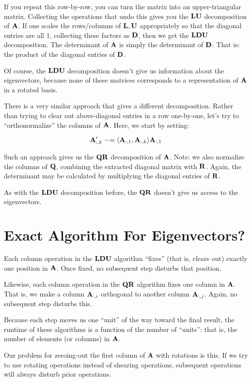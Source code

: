 \documentclass[11pt, oneside]{amsart}
\begin{document}
If you repeat this row-by-row, you can turn the matrix into an
upper-triangular matrix. Collecting the operations that undo this gives
you the $\mathbf{L}\mathbf{U}$ decomposition of $\mathbf{A}$. If one scales the
rows/columns of $\mathbf{L}, \mathbf{U}$ appropriately so that the diagonal
entries are all $1$, collecting these factors as $\mathbf{D}$, then we get
the $\mathbf{L}\mathbf{D}\mathbf{U}$ decomposition. The determinant of $\mathbf{A}$ is simply the
determinant of $\mathbf{D}$. That is: the product of the diagonal entries of
$\mathbf{D}$.

Of course, the $\mathbf{L}\mathbf{D}\mathbf{U}$ decomposition doesn't give us information about
the eigenvectors, because none of these matrices corresponds to a
representation of $\mathbf{A}$ in a rotated basis.

There is a very similar approach that gives a different decomposition.
Rather than trying to clear out above-diagonal entries in a row
one-by-one, let's try to ``orthonormalize'' the columns of $\mathbf{A}$. Here,
we start by setting:

\[
  \mathbf{A}'_{:, k} \mathrel{-}= \langle \mathbf{A}_{:, 1}, \mathbf{A}_{:,k} \rangle \mathbf{A}_{:, 1}
\]

Such an approach gives us the $\mathbf{Q}\mathbf{R}$ decomposition of $\mathbf{A}$.
Note: we also normalize the columns of $\mathbf{Q}$, combining the extracted
diagonal matrix with $\mathbf{R}$. Again, the determinant may be calculated
by multiplying the diagonal entries of $\mathbf{R}$.

As with the $\mathbf{L}\mathbf{D}\mathbf{U}$ decomposition before, the $\mathbf{Q}\mathbf{R}$ doesn't give us
access to the eigenvectors.

\section{Exact Algorithm For Eigenvectors?}

Each column operation in the $\mathbf{L}\mathbf{D}\mathbf{U}$ algorithm ``fixes'' (that is,
clears out) exactly one position in $\mathbf{A}$. Once fixed, no subsequent
step disturbs that position.

Likewise, each column operation in the $\mathbf{Q}\mathbf{R}$ algorithm fixes one
column in $\mathbf{A}$. That is, we make a column $\mathbf{A}_{:, i}$ orthogonal
to another column $\mathbf{A}_{:, j}$. Again, no subsequent step disturbs
this.

Because each step moves us one ``unit'' of the way toward the final
result, the runtime of these algorithms is a function of the number of
``units'': that is, the number of elements (or columns) in $\mathbf{A}$.

Our problem for zeroing-out the first column of $\mathbf{A}$ with rotations
is this. If we try to use rotating operations instead of shearing
operations, subsequent operations will always disturb prior operations.
\end{document}
